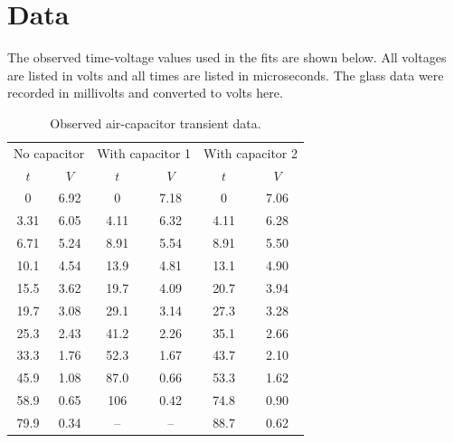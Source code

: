 \documentclass[letterpaper,12pt]{article}
\begin{document}
\section*{Data}

The observed time-voltage values used in the fits are shown below. All voltages are listed in volts and all times are listed in microseconds. The glass data were recorded in millivolts and converted to volts here.

\begin{table}[H]
    \centering
    \caption{Observed air-capacitor transient data.}
    \begin{tabular}{cccccc}
        \toprule
        \multicolumn{2}{c}{No capacitor} & \multicolumn{2}{c}{With capacitor 1} & \multicolumn{2}{c}{With capacitor 2} \\
        $t$ & $V$ & $t$ & $V$ & $t$ & $V$ \\
        \midrule
        0 & 6.92 & 0 & 7.18 & 0 & 7.06 \\
        3.31 & 6.05 & 4.11 & 6.32 & 4.11 & 6.28 \\
        6.71 & 5.24 & 8.91 & 5.54 & 8.91 & 5.50 \\
        10.1 & 4.54 & 13.9 & 4.81 & 13.1 & 4.90 \\
        15.5 & 3.62 & 19.7 & 4.09 & 20.7 & 3.94 \\
        19.7 & 3.08 & 29.1 & 3.14 & 27.3 & 3.28 \\
        25.3 & 2.43 & 41.2 & 2.26 & 35.1 & 2.66 \\
        33.3 & 1.76 & 52.3 & 1.67 & 43.7 & 2.10 \\
        45.9 & 1.08 & 87.0 & 0.66 & 53.3 & 1.62 \\
        58.9 & 0.65 & 106 & 0.42 & 74.8 & 0.90 \\
        79.9 & 0.34 & -- & -- & 88.7 & 0.62 \\
        \bottomrule
    \end{tabular}
\end{table}
\end{document}
